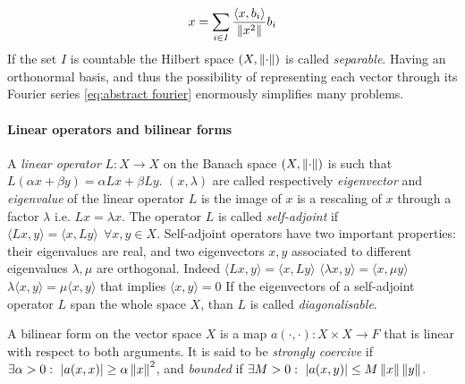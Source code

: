 \begin{equation}\label{eq:abstract fourier}
	x = \sum_{i\in I} \frac{\langle x, b_i\rangle}{\left\lVert x^2\right\rVert}b_i
\end{equation}
If the set $I$ is countable the Hilbert space $(X, \left\lVert\cdot\right\rVert)$ is called \textit{separable}. Having an orthonormal basis, and thus the possibility of representing each vector through its Fourier series \ref{eq:abstract fourier} enormously simplifies many problems.

\paragraph{Linear operators and bilinear forms} A \textit{linear operator} $L: X\to X$ on the Banach space $(X, \left\lVert\cdot\right\rVert)$ is such that $L(\alpha x + \beta y) = \alpha L x + \beta L y$. $(x, \lambda)$ are called respectively \textit{eigenvector} and \textit{eigenvalue} of the linear operator $L$ is the image of $x$ is a rescaling of $x$ through a factor $\lambda$ i.e. $Lx = \lambda x$. The operator $L$ is called \textit{self-adjoint} if $\langle Lx, y\rangle = \langle x,Ly\rangle\ \  \forall x,y \in X$. Self-adjoint operators have two important properties: their eigenvalues are real, and two eigenvectors $x, y$ associated to different eigenvalues $\lambda, \mu$ are orthogonal. Indeed 
$\langle Lx, y\rangle = \langle x,Ly\rangle$
$\langle \lambda x, y\rangle = \langle x,\mu y\rangle$
$\lambda \langle  x, y\rangle = \mu \langle x, y\rangle$
that implies $ \langle  x, y\rangle = 0$
If the eigenvectors of a self-adjoint operator $L$ span the whole space $X$, than $L$ is called \textit{diagonalisable}.

A bilinear form on the vector space $X$ is a map $a(\cdot, \cdot): X\times X\to F$ that is linear with respect to both arguments. It is said to be \textit{strongly coercive} if $\exists\alpha>0:\ |a(x, x)|\geq \alpha \left\lVert x\right\rVert^2$, and \textit{bounded} if $\exists M>0:\ |a(x, y)|\leq M \left\lVert x\right\rVert \left\lVert y\right\rVert$.
